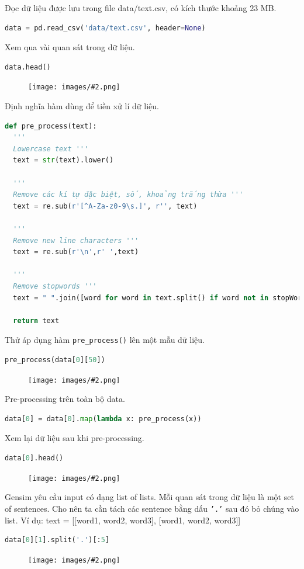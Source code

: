 \documentclass[12pt]{article}
\newcommand{\includeImage}[3]{
\begin{figure}[H]
  \centering
  \texttt{[image: images/\#2.png]}
  \def\temp{#3}\ifx\temp\empty\else\caption{#3}\fi
\end{figure}}
\begin{document}
\vskip 0.5cm
\indent Đọc dữ liệu được lưu trong file \textsf{data/text.csv}, có kích thước khoảng 23 MB.
\begin{lstlisting}[language=python]
data = pd.read_csv('data/text.csv', header=None)
\end{lstlisting}

\vskip 0.5cm
\indent Xem qua vài quan sát trong dữ liệu.
\begin{lstlisting}[language=python]
data.head()
\end{lstlisting}
\includeImage{1}{14}{}

\vskip 0.5cm
\indent Định nghĩa hàm dùng để tiền xử lí dữ liệu.
\begin{lstlisting}[language=python]
def pre_process(text):    
  '''
  Lowercase text '''
  text = str(text).lower()
  
  ''' 
  Remove các kí tự đặc biệt, số, khoảng trắng thừa '''
  text = re.sub(r'[^A-Za-z0-9\s.]', r'', text)
  
  '''
  Remove new line characters '''
  text = re.sub(r'\n',r' ',text)
  
  '''
  Remove stopwords '''
  text = " ".join([word for word in text.split() if word not in stopWords])
  
  return text
\end{lstlisting}

\vskip 0.5cm
\indent Thử áp dụng hàm \texttt{pre\_process()} lên một mẫu dữ liệu.
\begin{lstlisting}[language=python]
pre_process(data[0][50])
\end{lstlisting}
\includeImage{1}{15}{}

\vskip 0.5cm
\indent Pre-processing trên toàn bộ data.\
\begin{lstlisting}[language=python]
data[0] = data[0].map(lambda x: pre_process(x))
\end{lstlisting}

\vskip 0.5cm
\indent Xem lại dữ liệu sau khi pre-processing.
\begin{lstlisting}[language=python]
data[0].head()
\end{lstlisting}
\includeImage{1}{16}{}

\vskip 0.5cm
\indent Gensim yêu cầu input có dạng list of lists. Mỗi quan sát trong dữ liệu là một set of sentences. Cho nên ta cần tách các sentence bằng dấu \texttt{'.'} sau đó bỏ chúng vào list. Ví dụ: text = [[word1, word2, word3], [word1, word2, word3]]
\begin{lstlisting}[language=python]
data[0][1].split('.')[:5]
\end{lstlisting}
\includeImage{1}{17}{}
\end{document}
